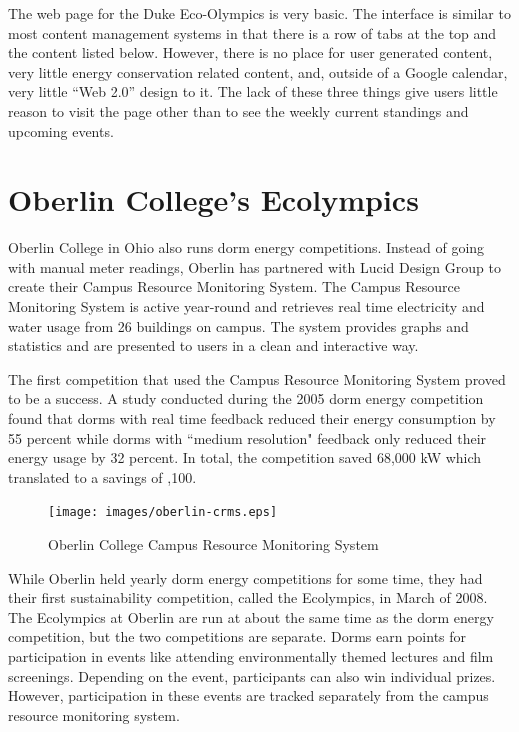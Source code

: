 The web page for the Duke Eco-Olympics is very basic.  The interface is similar to most content management systems in that there is a row of tabs at the top and the content listed below.  However, there is no place for user generated content, very little energy conservation related content, and, outside of a Google calendar, very little ``Web 2.0'' design to it.  The lack of these three things give users little reason to visit the page other than to see the weekly current standings and upcoming events.

\section{Oberlin College's Ecolympics}
\label{oberlin-ecolympics}

Oberlin College in Ohio also runs dorm energy competitions.  Instead of going with manual meter readings, Oberlin has partnered with Lucid Design Group to create their Campus Resource Monitoring System\cite{oberlin-comp}.  The Campus Resource Monitoring System is active year-round and retrieves real time electricity and water usage from 26 buildings\cite{lucid-oberlin} on campus.  The system provides graphs and statistics and are presented to users in a clean and interactive way.

The first competition that used the Campus Resource Monitoring System proved to be a success.  A study conducted during the 2005 dorm energy competition found that dorms with real time feedback reduced their energy consumption by 55 percent while dorms with ``medium resolution" feedback only reduced their energy usage by 32 percent\cite{oberlin-goals}.  In total, the competition saved 68,000 kW which translated to a savings of ,100.

\begin{figure}
	\centering
	\texttt{[image: images/oberlin-crms.eps]}
	\caption{Oberlin College Campus Resource Monitoring System}
\end{figure}

While Oberlin held yearly dorm energy competitions for some time, they had their first sustainability competition, called the Ecolympics, in March of 2008\cite{oberlin-history}.  The Ecolympics at Oberlin are run at about the same time as the dorm energy competition, but the two competitions are separate.  Dorms earn points for participation in events like attending environmentally themed lectures and film screenings\cite{oberlin-news}.  Depending on the event, participants can also win individual prizes.  However, participation in these events are tracked separately from the campus resource monitoring system.

